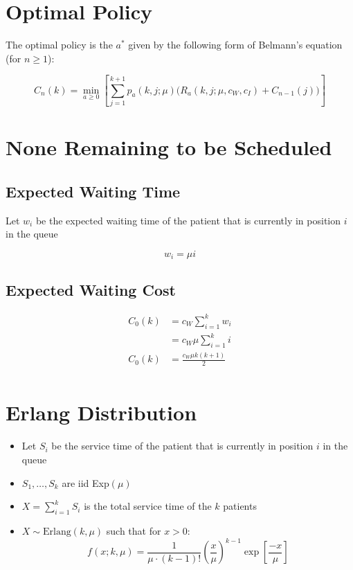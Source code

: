 \documentclass{article}
\begin{document}
\section{Optimal Policy}

The optimal policy is the $a^{*}$ given by the following form of Belmann's equation (for $n \geq 1$):

\begin{equation}
	C_{n} (k) = \min_{a \geq 0} \left[ \sum_{j = 1}^{k + 1} p_{a} (k, j; \mu) \Big( R_{a} (k, j; \mu, c_{W}, c_{I}) + C_{n - 1} (j) \Big) \right]
\end{equation}

\section{None Remaining to be Scheduled}

\subsection{Expected Waiting Time}

Let $w_{i}$ be the expected waiting time of the patient that is currently in position $i$ in the queue

\begin{equation*}
	w_{i} = \mu i
\end{equation*}

\newpage

\subsection{Expected Waiting Cost}

\begin{align*}
	C_{0} (k) & = c_{W} \sum_{i = 1}^{k} w_{i} \\
	& = c_{W} \mu \sum_{i = 1}^{k} i \\
	C_{0} (k) & = \frac{c_{W} \mu k (k + 1)}{2} \\
\end{align*}

\section{Erlang Distribution}

\begin{itemize}
	\item Let $S_{i}$ be the service time of the patient that is currently in position $i$ in the queue
	\item $S_{1}, \ldots, S_{k}$ are iid Exp$(\mu)$
	\item $X = \sum_{i = 1}^{k} S_{i}$ is the total service time of the $k$ patients
	\item $X \sim \text{Erlang} (k, \mu)$ such that for $x > 0$:
		\begin{equation*}
			f (x; k, \mu) = \frac{1}{\mu \cdot (k - 1)!} \left( \frac{x}{\mu} \right)^{k - 1} \exp \left[ \frac{-x}{\mu} \right]
		\end{equation*}
\end{itemize}
\end{document}
